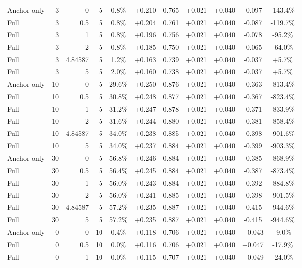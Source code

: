 \begin{table}[htbp]
\begin{tabular}{lrrrccccccc}
Anchor only & 3 & 0 & 5 & 0.8\% & +0.210 & 0.765 & +0.021 & +0.040 & -0.097 & -143.4\% \\
Full & 3 & 0.5 & 5 & 0.8\% & +0.204 & 0.761 & +0.021 & +0.040 & -0.087 & -119.7\% \\
Full & 3 & 1 & 5 & 0.8\% & +0.196 & 0.756 & +0.021 & +0.040 & -0.078 & -95.2\% \\
Full & 3 & 2 & 5 & 0.8\% & +0.185 & 0.750 & +0.021 & +0.040 & -0.065 & -64.0\% \\
Full & 3 & 4.84587 & 5 & 1.2\% & +0.163 & 0.739 & +0.021 & +0.040 & -0.037 & +5.7\% \\
Full & 3 & 5 & 5 & 2.0\% & +0.160 & 0.738 & +0.021 & +0.040 & -0.037 & +5.7\% \\
Anchor only & 10 & 0 & 5 & 29.6\% & +0.250 & 0.876 & +0.021 & +0.040 & -0.363 & -813.4\% \\
Full & 10 & 0.5 & 5 & 30.8\% & +0.248 & 0.877 & +0.021 & +0.040 & -0.367 & -823.4\% \\
Full & 10 & 1 & 5 & 31.2\% & +0.247 & 0.878 & +0.021 & +0.040 & -0.371 & -833.9\% \\
Full & 10 & 2 & 5 & 31.6\% & +0.244 & 0.880 & +0.021 & +0.040 & -0.381 & -858.4\% \\
Full & 10 & 4.84587 & 5 & 34.0\% & +0.238 & 0.885 & +0.021 & +0.040 & -0.398 & -901.6\% \\
Full & 10 & 5 & 5 & 34.0\% & +0.237 & 0.884 & +0.021 & +0.040 & -0.399 & -903.3\% \\
Anchor only & 30 & 0 & 5 & 56.8\% & +0.246 & 0.884 & +0.021 & +0.040 & -0.385 & -868.9\% \\
Full & 30 & 0.5 & 5 & 56.4\% & +0.245 & 0.884 & +0.021 & +0.040 & -0.387 & -873.4\% \\
Full & 30 & 1 & 5 & 56.0\% & +0.243 & 0.884 & +0.021 & +0.040 & -0.392 & -884.8\% \\
Full & 30 & 2 & 5 & 56.0\% & +0.241 & 0.885 & +0.021 & +0.040 & -0.398 & -901.5\% \\
Full & 30 & 4.84587 & 5 & 57.2\% & +0.235 & 0.887 & +0.021 & +0.040 & -0.415 & -944.6\% \\
Full & 30 & 5 & 5 & 57.2\% & +0.235 & 0.887 & +0.021 & +0.040 & -0.415 & -944.6\% \\
Anchor only & 0 & 0 & 10 & 0.4\% & +0.118 & 0.706 & +0.021 & +0.040 & +0.043 & -9.0\% \\
Full & 0 & 0.5 & 10 & 0.0\% & +0.116 & 0.706 & +0.021 & +0.040 & +0.047 & -17.9\% \\
Full & 0 & 1 & 10 & 0.0\% & +0.115 & 0.707 & +0.021 & +0.040 & +0.049 & -24.0\% \\

\end{tabular}
\end{table}
